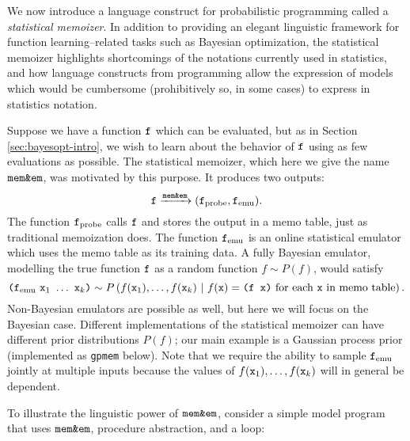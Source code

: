 We now introduce a language construct for probabilistic programming called a
\emph{statistical memoizer}.  In addition to providing an elegant linguistic
framework for function learning--related tasks such as Bayesian optimization,
the statistical memoizer highlights shortcomings of the notations currently used
in statistics, and how language constructs from programming allow the expression
of models which would be cumbersome (prohibitively so, in some cases) to express
in statistics notation.

Suppose we have a function $\texttt{f}$ which can be evaluated, but as in Section
\ref{sec:bayesopt-intro}, we wish to learn about the behavior of $\texttt{f}$ using as
few evaluations as possible.  The statistical memoizer, which here we give the
name $\texttt{mem\&em}$, was motivated by this purpose.  It produces two outputs:
\[ \texttt{f} \xrightarrow{\texttt{mem\&em}} (\texttt{f}_{\textrm{probe}}, \texttt{f}_{\textrm{emu}}). \]
The function $\texttt{f}_{\textrm{probe}}$ calls $\texttt{f}$ and stores the output in a memo
table, just as traditional memoization does.  The function $\texttt{f}_{\textrm{emu}}$ is
an online statistical emulator which uses the memo table as its training
data.  A fully Bayesian emulator, modelling the true function $\texttt{f}$ as a
random function $f \sim P(f)$, would satisfy
\[
\texttt{(}\ftt_\emu\ \xtt_1\ \ldots\ \xtt_k\texttt{)}
\sim
P\pn{
  f(\xtt_1), \ldots, f(\xtt_k)
  \mvert
  \text{$f(\xtt) = \texttt{(f x)}$ for each $\xtt$ in memo table}
}.
\]
Non-Bayesian emulators are possible as well, but here we will focus on the
Bayesian case.  Different implementations of the statistical memoizer can have
different prior distributions $P(f)$; our main example is a Gaussian process
prior (implemented as \texttt{gpmem} below).  Note that we require the ability
to sample $\texttt{f}_{\textrm{emu}}$ jointly at multiple inputs because the values of
$f(\texttt{x}_1),\ldots,f(\texttt{x}_k)$ will in general be dependent.

To illustrate the linguistic power of $\texttt{mem\&em}$, consider a simple model program
that uses $\texttt{mem\&em}$, procedure abstraction, and a loop:

